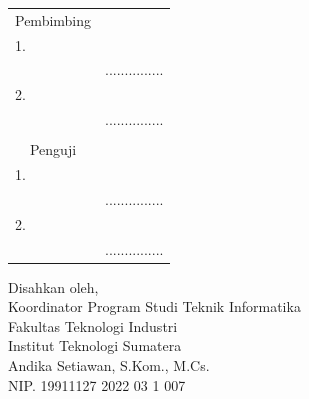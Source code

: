 \begin{center}
	\justify
    \setlength{\tabcolsep}{0pt}
    \begin{tabular}{ m{0.5cm}  m{} >{\centering\arraybackslash}m{}}
        \multicolumn{2}{c}{\hspace*{70pt}Pembimbing} & \multicolumn{1}{c}{} \\[2pt]
		1. & \printnamadosbinga & \\
		 & \printnipdosbinga & ............... \\[5pt]
		2. & \printnamadosbingb & \\
		& \printnipdosbingb & ............... \\%
		& \\
		\multicolumn{2}{c}{\hspace*{70pt}Penguji} & \multicolumn{1}{c}{} \\[2pt]
		1. & \printnamapengujia & \\
		 & \printnippengujia & ............... \\[5pt]
		2. & \printnamapengujib & \\
		& \printnippengujib & ............... \\
    \end{tabular}

	\begin{center}
		\fontsize{10pt}{10pt}
        \vspace{0.45cm}
		Disahkan oleh,\\
		Koordinator Program Studi Teknik Informatika\\
		Fakultas Teknologi Industri\\
		Institut Teknologi Sumatera
		\vspace{1.8cm}\\
		Andika Setiawan, S.Kom., M.Cs. \\ %
		NIP. 19911127 2022 03 1 007 \\
	\end{center}
	\vfill

\end{center}
\clearpage